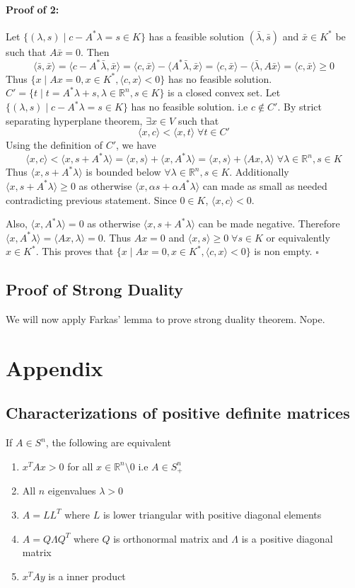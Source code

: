 \documentclass[a4paper,11pt]{article}
\newcommand{\Rn}{\mathbb{R}^n}
\newcommand\inrpd[2]{\langle #1, #2 \rangle}
\begin{document}
\paragraph{Proof of 2:}
Let  $\{(\lambda,s) \mid c - A^*\lambda  = s \in K \}$  has a  feasible solution $(\bar{\lambda},\bar{s})$ and  $\bar{x} \in K^*$ be such that $A\bar{x} = 0$. Then 
\[
\inrpd{\bar{s}}{\bar{x}} =  \inrpd{c - A^*\bar{\lambda} }{\bar{x}} = \inrpd{c}{\bar{x}} - \inrpd{ A^*\bar{\lambda} }{\bar{x}}
= \inrpd{c}{\bar{x}} - \inrpd{ \bar{\lambda} }{A\bar{x}} = \inrpd{c}{\bar{x}} \geq 0
\]
Thus $\{x \mid Ax = 0, x\in K^*, \inrpd{c}{x} < 0 \}$ has no feasible solution.
\\


$C' = \{t \mid t = A^*\lambda  + s, \lambda \in \Rn, s \in K \}$ is a closed convex set. Let $\{(\lambda,s) \mid c - A^*\lambda  = s \in K \}$  has no feasible solution. i.e $c \notin C'$.
By strict separating hyperplane theorem, $\exists x \in V$ such that 
\[ \inrpd{x}{c} < \inrpd{x}{t}\; \forall t \in C'\]
Using the definition of $C'$, we have 
\[ \inrpd{x}{c} < \inrpd{x}{s + A^*\lambda} = \inrpd{x}{s}  + \inrpd{x}{A^*\lambda}
 =  \inrpd{x}{s}  + \inrpd{Ax}{\lambda}
\; \forall \lambda \in \Rn,  s \in K
\]
Thus $\inrpd{x}{s + A^*\lambda}$ is bounded below $\forall \lambda \in \Rn, s \in K$. Additionally $\inrpd{x}{s + A^*\lambda} \geq 0$ as otherwise $\inrpd{x}{\alpha s + \alpha A^*\lambda}$ can made as small as needed contradicting previous statement. Since $0 \in K$, $\inrpd{x}{c} <0$. 


Also, $\inrpd{x}{A^*\lambda} = 0$ as otherwise $\inrpd{x}{ s + A^*\lambda}$ can be made negative.
Therefore $\inrpd{x}{A^*\lambda} = \inrpd{Ax}{\lambda} = 0$. Thus $Ax = 0$ and $\inrpd{x}{s} \geq 0 \; \forall s \in K$ or equivalently $x \in K^*$.
This proves that $\{x \mid Ax = 0, x\in K^*, \inrpd{c}{x} < 0 \}$ is non empty.
$\square$


\subsection{Proof of Strong Duality}
We will now apply Farkas' lemma to prove strong duality theorem.
Nope.


\appendix
\section{Appendix}
\subsection{Characterizations of positive definite matrices}
If $A \in S^n$, the following are equivalent
\begin{enumerate}
\item $x^T A x > 0$ for all $x \in \Rn \setminus{0}$ i.e $A\in S^n_+$
\item All $n$ eigenvalues $\lambda > 0$
\item $A = LL^T$ where $L$ is lower triangular with positive diagonal elements
\item $A = Q\Lambda Q^T$ where $Q$ is orthonormal matrix and $\Lambda$ is a positive diagonal matrix
\item $x^T A y$ is a inner product
\end{enumerate}
\end{document}
